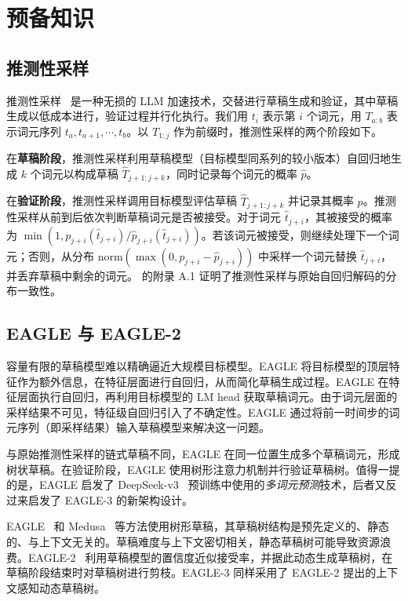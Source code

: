\documentclass[11pt]{article}
\begin{document}
\section{预备知识}
\subsection{推测性采样}

推测性采样~\cite{leviathan2023fast,chen2023accelerating,sun2024spectr,sun2024optimal} 是一种无损的 LLM 加速技术，交替进行草稿生成和验证，其中草稿生成以低成本进行，验证过程并行化执行。我们用 $t_i$ 表示第 $i$ 个词元，用 $T_{a:b}$ 表示词元序列 $t_a, t_{a+1}, \cdots, t_b$。以 $T_{1:j}$ 作为前缀时，推测性采样的两个阶段如下。

在\textbf{草稿阶段}，推测性采样利用草稿模型（目标模型同系列的较小版本）自回归地生成 $k$ 个词元以构成草稿 $\hat{T}_{j+1:j+k}$，同时记录每个词元的概率 $\hat{p}$。

在\textbf{验证阶段}，推测性采样调用目标模型评估草稿 $\hat{T}_{j+1:j+k}$ 并记录其概率 $p$。推测性采样从前到后依次判断草稿词元是否被接受。对于词元 $\hat{t}_{j+i}$，其被接受的概率为 $\min(1, p_{j+i}(\hat{t}_{j+i})/\hat{p}_{j+i}(\hat{t}_{j+i}))$。若该词元被接受，则继续处理下一个词元；否则，从分布 $\text{norm}(\max(0, p_{j+i} - \hat{p}_{j+i}))$ 中采样一个词元替换 $\hat{t}_{j+i}$，并丢弃草稿中剩余的词元。\cite{leviathan2023fast} 的附录 A.1 证明了推测性采样与原始自回归解码的分布一致性。

\subsection{EAGLE 与 EAGLE-2}

容量有限的草稿模型难以精确逼近大规模目标模型。EAGLE 将目标模型的顶层特征作为额外信息，在特征层面进行自回归，从而简化草稿生成过程。EAGLE 在特征层面执行自回归，再利用目标模型的 LM head 获取草稿词元。由于词元层面的采样结果不可见，特征级自回归引入了不确定性。EAGLE 通过将前一时间步的词元序列（即采样结果）输入草稿模型来解决这一问题。

与原始推测性采样的链式草稿不同，EAGLE 在同一位置生成多个草稿词元，形成树状草稿。在验证阶段，EAGLE 使用树形注意力机制并行验证草稿树。值得一提的是，EAGLE 启发了 DeepSeek-v3~\cite{liu2024deepseek} 预训练中使用的\emph{多词元预测}技术，后者又反过来启发了 EAGLE-3 的新架构设计。

EAGLE~\cite{li2024eagle} 和 Medusa~\cite{cai2024medusa} 等方法使用树形草稿，其草稿树结构是预先定义的、静态的、与上下文无关的。草稿难度与上下文密切相关，静态草稿树可能导致资源浪费。EAGLE-2~\cite{li2024eagle2} 利用草稿模型的置信度近似接受率，并据此动态生成草稿树，在草稿阶段结束时对草稿树进行剪枝。EAGLE-3 同样采用了 EAGLE-2 提出的上下文感知动态草稿树。
\end{document}
